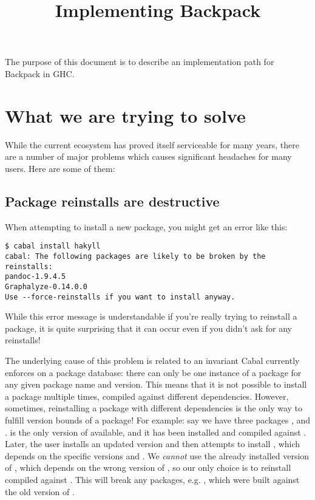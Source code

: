 \documentclass{article}
\title{Implementing Backpack}
\begin{document}
\maketitle

The purpose of this document is to describe an implementation path
for Backpack in GHC\@.

\tableofcontents

\section{What we are trying to solve}

While the current ecosystem has proved itself serviceable for many years,
there are a number of major problems which causes significant headaches
for many users.  Here are some of them:

\subsection{Package reinstalls are destructive}\label{sec:destructive}

When attempting to install a new package, you might get an error like
this:

\begin{verbatim}
$ cabal install hakyll
cabal: The following packages are likely to be broken by the reinstalls:
pandoc-1.9.4.5
Graphalyze-0.14.0.0
Use --force-reinstalls if you want to install anyway.
\end{verbatim}

While this error message is understandable if you're really trying to
reinstall a package, it is quite surprising that it can occur even if
you didn't ask for any reinstalls!

The underlying cause of this problem is related to an invariant Cabal
currently enforces on a package database: there can only be one instance
of a package for any given package name and version.  This means that it
is not possible to install a package multiple times, compiled against
different dependencies.  However, sometimes, reinstalling a package with
different dependencies is the only way to fulfill version bounds of a
package!  For example: say we have three packages , 
and .   is the only version of 
available, and it has been installed and compiled against .
Later, the user installs an updated version  and then
attempts to install , which depends on the specific versions
 and .  We \emph{cannot} use the already
installed version of , which depends on the wrong version
of , so our only choice is to reinstall  compiled
against .  This will break any packages, e.g. ,
which were built against the old version of .
\end{document}
